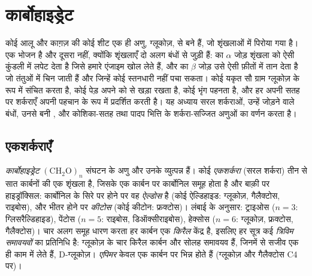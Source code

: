\chapter{कार्बोहाइड्रेट}\label{ch:b1:carbohydrates}

कोई आलू और काग़ज़ की कोई शीट एक ही अणु, ग्लूकोज़, से बने हैं, जो
शृंखलाओं में पिरोया गया है। एक भोजन है और दूसरा नहीं, क्योंकि शृंखलाएँ दो
अलग बंधों से जुड़ी हैं:  का $\alpha$ जोड़ शृंखला को ऐसी कुंडली में
लपेट देता है जिसे हमारे एंजाइम खोल लेते हैं, और  का $\beta$ जोड़
उसे ऐसी फ़ीतों में तान देता है जो तंतुओं में चिन जाती हैं और जिन्हें कोई
स्तनधारी नहीं पचा सकता। कोई यकृत सौ ग्राम ग्लूकोज़  के रूप में
संचित करता है, कोई पेड़ अपने को  से खड़ा रखता है, कोई भृंग 
पहनता है, और हर  अपनी सतह पर शर्कराएँ अपनी पहचान के रूप में
प्रदर्शित करती है। यह अध्याय सरल शर्कराओं, उन्हें जोड़ने वाले बंधों, उनसे
बनी , और कोशिका-सतह तथा पादप भित्ति के शर्करा-सज्जित अणुओं का
वर्णन करता है।

\section{एकशर्कराएँ}

\begin{definition}[एकशर्करा]\label{def:b1:carbohydrates:monosaccharide}
\emph{कार्बोहाइड्रेट} $(\mathrm{CH_2O})_n$ संघटन
के अणु और उनके व्युत्पन्न हैं। कोई
\emph{एकशर्करा} (सरल शर्करा) तीन से सात कार्बनों की एक
शृंखला है, जिसके एक कार्बन पर कार्बोनिल समूह होता है और बाक़ी पर
हाइड्रॉक्सिल: कार्बोनिल के सिरे पर होने पर वह \emph{ऐल्डोस}
है (कोई ऐल्डिहाइड: ग्लूकोज़, गैलैक्टोस, राइबोस), और भीतर होने पर
\emph{कीटोस} (कोई कीटोन: फ्रक्टोस)।
लंबाई के अनुसार: ट्राइओस ($n = 3$: ग्लिसरैल्डिहाइड), पेंटोस ($n = 5$:
राइबोस, डिऑक्सीराइबोस), हेक्सोस ($n = 6$: ग्लूकोज़, फ्रक्टोस, गैलैक्टोस)।
चार अलग समूह धारण करता हर कार्बन एक \emph{किरैल} केंद्र है,
इसलिए हर सूत्र कई \emph{त्रिविम समावयवों} का प्रतिनिधि है: ग्लूकोज़ के
चार किरैल कार्बन और सोलह समावयव हैं, जिनमें से सजीव एक ही काम में लेते
हैं, D-ग्लूकोज़। \emph{एपिमर} केवल एक कार्बन पर भिन्न होते हैं (ग्लूकोज़
और गैलैक्टोस C4 पर)।
\end{definition}

